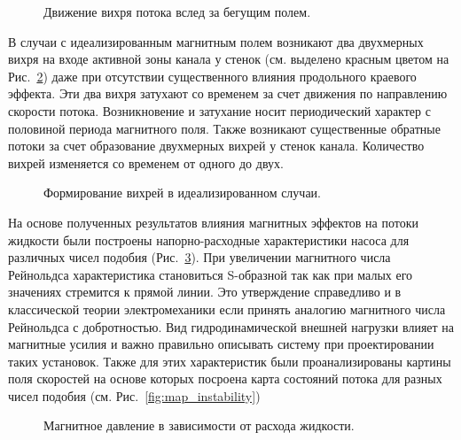 \begin{figure}[h]
	\caption{Движение вихря потока вслед за бегущим полем.}
	\label{fig:motion_vortex}
	
\end{figure}

В случаи с идеализированным магнитным полем возникают два двухмерных вихря на входе активной зоны канала у стенок (см. выделено красным цветом на Рис.~\ref{fig:induced_vortex}) даже при отсутствии существенного влияния продольного краевого эффекта. Эти два вихря затухают со временем за счет движения по направлению скорости потока. Возникновение и затухание носит периодический характер с половиной периода магнитного поля. Также возникают существенные обратные потоки за счет образование двухмерных вихрей у стенок канала. Количество вихрей изменяется со временем от одного до двух. 

\begin{figure}[h]
	\caption{Формирование вихрей в идеализированном случаи.}
	\label{fig:induced_vortex}
\end{figure}
 
На основе полученных результатов влияния магнитных эффектов на потоки жидкости были построены напорно-расходные характеристики насоса для различных чисел подобия (Рис.~\ref{fig:pq_magnetic}). При увеличении магнитного числа Рейнольдса характеристика становиться S-образной так как при малых его значениях стремится к прямой линии. Это утверждение справедливо и в классической теории электромеханики если принять аналогию магнитного числа Рейнольдса с добротностью. Вид гидродинамической внешней нагрузки влияет на магнитные усилия и важно правильно описывать систему при проектировании таких установок. Также для этих характеристик были проанализированы картины поля скоростей на основе которых посроена карта состояний потока для разных чисел подобия (см. Рис.~\ref{fig:map_instability})
\begin{figure}[t]
	\caption{Магнитное давление в зависимости от расхода жидкости.}
	\label{fig:pq_magnetic}
\end{figure}


